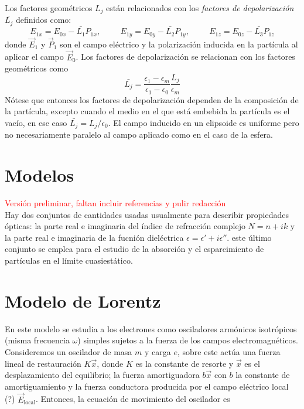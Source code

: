 \documentclass[paper=letter, fontsize=12pt,]{article}
\begin{document}
Los factores geométricos $L_j$ están relacionados con los \textit{factores de depolarización} $\bar{L_j}$ definidos como:
\begin{equation*}
    E_{1x}=E_{0x}-\bar{L_1}P_{1x},\hspace{1cm}    E_{1y}=E_{0y}-\bar{L_2}P_{1y},\hspace{1cm}    E_{1z}=E_{0z}-\bar{L_3}P_{1z}
\end{equation*}
donde $\Vec{E}_1$ y $\Vec{P}_1$ son el campo eléctrico y la polarización inducida en la partícula al aplicar el campo $\Vec{E}_0$. Los factores de depolarización se relacionan con los factores geométricos como \cite{Bohren}
\begin{equation*}
    \bar{L_j}=\frac{\epsilon_1-\epsilon_m}{\epsilon_1-\epsilon_0}\frac{L_j}{\epsilon_m}
\end{equation*}
Nótese que entonces los factores de depolarización dependen de la composición de la partícula, excepto cuando el medio en el que está embebida la partícula es el vacío, en ese caso $\bar{L_j}=L_j/\epsilon_0$. El campo inducido en un elipsoide es uniforme pero no necesariamente paralelo al campo aplicado como en el caso de la esfera.



\section{Modelos}
\textcolor{red}{Versión preliminar, faltan incluir referencias y pulir redacción}\\
 

Hay dos conjuntos de cantidades usadas usualmente para describir propiedades ópticas: la parte real e imaginaria del índice de refracción complejo $N=n+ik$ y la parte real e imaginaria de la fucnión dieléctrica $\epsilon=\epsilon'+i\epsilon''$. este último conjunto se emplea para el estudio de la absorción y el esparcimiento de partículas en el límite cuasiestático.

\section{Modelo de Lorentz}
En este modelo se estudia a los electrones como osciladores armónicos isotrópicos (misma frecuencia $\omega$) simples sujetos a la fuerza de los campos electromagnéticos. Consideremos un oscilador de masa $m$ y carga $e$, sobre este actúa una fuerza lineal de restauración  $K\Vec{x}$, donde $K$ es la constante de resorte y $\Vec{x}$ es el desplazamiento del equilibrio; la fuerza amortiguadora  $b\Vec{x}$ con $b$ la constante de amortiguamiento y la fuerza conductora producida por el campo eléctrico local (?)  $\Vec{E}_{\mbox{local}}$. Entonces, la ecuación de movimiento del oscilador es
\end{document}
